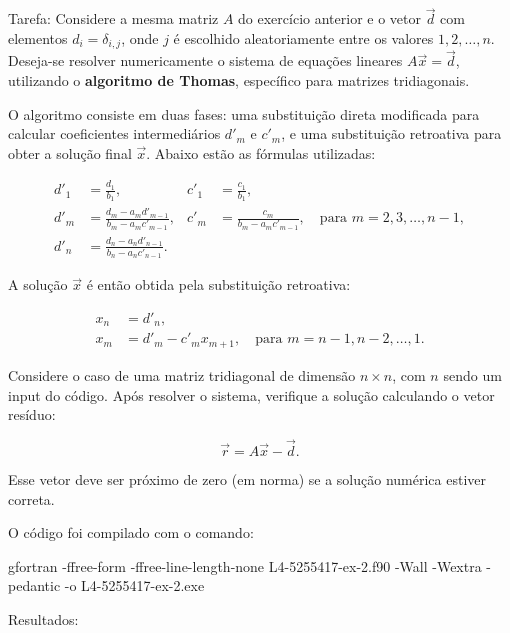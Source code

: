 \documentclass[12pt, a4paper]{article} %
\begin{document}
        Tarefa: Considere a mesma matriz $A$ do exerc\'icio anterior e o vetor $\vec{d}$ com elementos $d_i = \delta_{i,j}$, onde $j$ \'e escolhido aleatoriamente entre os valores $1, 2, \dots, n$. Deseja-se resolver numericamente o sistema de equa\c{c}\~oes lineares $A \vec{x} = \vec{d}$, utilizando o \textbf{algoritmo de Thomas}, espec\'ifico para matrizes tridiagonais.

        O algoritmo consiste em duas fases: uma substitui\c{c}\~ao direta modificada para calcular coeficientes intermedi\'arios $d'_m$ e $c'_m$, e uma substitui\c{c}\~ao retroativa para obter a solu\c{c}\~ao final $\vec{x}$. Abaixo est\~ao as f\'ormulas utilizadas:
        
        \begin{align*}
        d'_1 &= \frac{d_1}{b_1}, &
        c'_1 &= \frac{c_1}{b_1}, \\
        d'_m &= \frac{d_m - a_m d'_{m-1}}{b_m - a_m c'_{m-1}}, &
        c'_m &= \frac{c_m}{b_m - a_m c'_{m-1}}, \quad \text{para } m = 2, 3, \dots, n-1, \\
        d'_n &= \frac{d_n - a_n d'_{n-1}}{b_n - a_n c'_{n-1}}.
        \end{align*}
        
        A solu\c{c}\~ao $\vec{x}$ \'e ent\~ao obtida pela substitui\c{c}\~ao retroativa:
        
        \begin{align*}
        x_n &= d'_n, \\
        x_m &= d'_m - c'_m x_{m+1}, \quad \text{para } m = n-1, n-2, \dots, 1.
        \end{align*}
        
        Considere o caso de uma matriz tridiagonal de dimens\~ao $n \times n$, com $n$ sendo um input do c\'odigo. Ap\'os resolver o sistema, verifique a solu\c{c}\~ao calculando o vetor res\'iduo:
        
        \[
        \vec{r} = A\vec{x} - \vec{d}.
        \]
        
        Esse vetor deve ser pr\'oximo de zero (em norma) se a solu\c{c}\~ao num\'erica estiver correta.        

        O c\'odigo foi compilado com o comando:

gfortran -ffree-form -ffree-line-length-none L4-5255417-ex-2.f90 -Wall -Wextra -pedantic -o L4-5255417-ex-2.exe

        Resultados:
\end{document}
